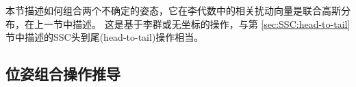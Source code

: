本节描述如何组合两个不确定的姿态，它在李代数中的相关扰动向量是联合高斯分布，在上一节中描述。 
这是基于李群或无坐标的操作，与第 \ref{sec:SSC:head-to-tail} 节中描述的SSC头到尾(head-to-tail)操作相当。 

\subsection{位姿组合操作推导}

